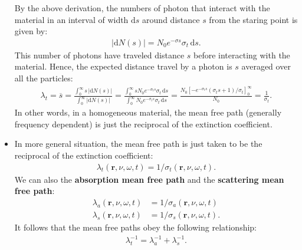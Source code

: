 \documentclass[10pt]{article}
\newcommand{\dee}{\mathrm{d}}
\newcommand{\ve}[1]{\mathbf{#1}}
\begin{document}
\begin{itemize}
    By the above derivation, the numbers of photon that interact with the material in an interval of width $\dee s$ around distance $s$ from the staring point is given by:
    \begin{align*}
      | \dee N(s) | = N_0 e^{-\sigma s} \sigma_t\, \dee s.
    \end{align*}
    This number of photons have traveled distance $s$ before interacting with the material. Hence, the expected distance travel by a photon is $s$ averaged over all the particles:
    \begin{align*}
      \lambda_t 
       = \overline{s}
       = \frac{\int_{0}^\infty s\, |\dee N(s)|}{\int_{0}^\infty |\dee N(s)|}
       = \frac{\int_{0}^\infty s N_0 e^{-\sigma_t s }\sigma_t \, \dee s}{\int_{0}^\infty N_0 e^{-\sigma_t s }\sigma_t \, \dee s}
       = \frac{N_0[-e^{-\sigma_t s}(\sigma_t s + 1) / \sigma_t]_0^\infty}{N_0}
       = \frac{1}{\sigma_t}.
    \end{align*}
    In other words, in a homogeneous material, the mean free path (generally frequency dependent) is just the reciprocal of the extinction coefficient.

    \item In more general situation, the mean free path is just taken to be the reciprocal of the extinction coefficient:
    \begin{align*}
      \lambda_t(\ve{r}, \nu, \omega, t) = 1 / \sigma_t(\ve{r}, \nu, \omega, t).
    \end{align*}
    We can also the \textbf{absorption mean free path} and the \textbf{scattering mean free path}:
    \begin{align*}
      \lambda_a(\ve{r}, \nu, \omega, t) &= 1 / \sigma_a(\ve{r}, \nu, \omega, t) \\
      \lambda_s(\ve{r}, \nu, \omega, t) &= 1 / \sigma_s(\ve{r}, \nu, \omega, t).
    \end{align*}
    It follows that the mean free paths obey the following relationship:
    \begin{align*}
      \lambda_t^{-1} = \lambda_a^{-1} + \lambda_s^{-1}.
    \end{align*}
  \end{itemize}
\end{document}
